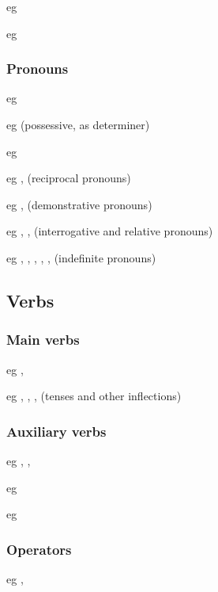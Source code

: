eg 

eg 

\subsubsection{Pronouns}

eg 

eg  (possessive, as determiner)

eg 

eg ,  (reciprocal pronouns)

eg ,  (demonstrative pronouns)

eg , ,  (interrogative and relative pronouns)

eg , , , , ,  (indefinite pronouns)

\subsection{Verbs}

\subsubsection{Main verbs}

eg , 

eg , , ,  (tenses and other inflections)

\subsubsection{Auxiliary verbs}

eg , , 

eg 

eg 

\subsubsection{Operators}

eg , 

